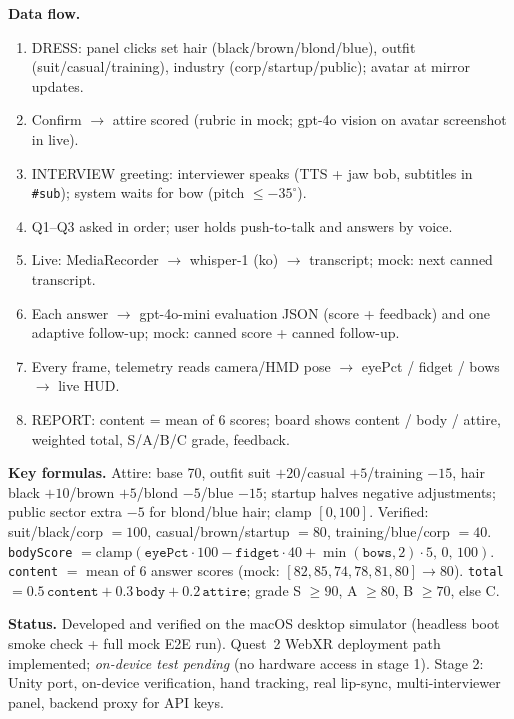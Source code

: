 \documentclass[10pt,a4paper]{article}
\begin{document}
\textbf{Data flow.}
{\footnotesize
\begin{enumerate}\setlength{\itemsep}{0pt}
  \item DRESS: panel clicks set hair (black/brown/blond/blue), outfit (suit/casual/training), industry (corp/startup/public); avatar at mirror updates.
  \item Confirm $\to$ attire scored (rubric in mock; gpt-4o vision on avatar screenshot in live).
  \item INTERVIEW greeting: interviewer speaks (TTS + jaw bob, subtitles in \texttt{\#sub}); system waits for bow (pitch $\le -35^\circ$).
  \item Q1--Q3 asked in order; user holds push-to-talk and answers by voice.
  \item Live: MediaRecorder $\to$ whisper-1 (ko) $\to$ transcript; mock: next canned transcript.
  \item Each answer $\to$ gpt-4o-mini evaluation JSON (score + feedback) and one adaptive follow-up; mock: canned score + canned follow-up.
  \item Every frame, telemetry reads camera/HMD pose $\to$ eyePct / fidget / bows $\to$ live HUD.
  \item REPORT: content = mean of 6 scores; board shows content / body / attire, weighted total, S/A/B/C grade, feedback.
\end{enumerate}}
\vspace{-4pt}

\textbf{Key formulas.} Attire: base 70, outfit suit $+20$/casual $+5$/training $-15$, hair black $+10$/brown $+5$/blond $-5$/blue $-15$; startup halves negative adjustments; public sector extra $-5$ for blond/blue hair; clamp $[0,100]$. Verified: suit/black/corp $=100$, casual/brown/startup $=80$, training/blue/corp $=40$. \;
\texttt{bodyScore} $=\mathrm{clamp}(\texttt{eyePct}\cdot100-\texttt{fidget}\cdot40+\min(\texttt{bows},2)\cdot5,\,0,\,100)$. \;
\texttt{content} $=$ mean of 6 answer scores (mock: $[82,85,74,78,81,80]\to80$). \;
\texttt{total} $=0.5\,\texttt{content}+0.3\,\texttt{body}+0.2\,\texttt{attire}$; grade S $\ge90$, A $\ge80$, B $\ge70$, else C.

\textbf{Status.} Developed and verified on the macOS desktop simulator (headless boot smoke check + full mock E2E run). Quest~2 WebXR deployment path implemented; \emph{on-device test pending} (no hardware access in stage 1). Stage 2: Unity port, on-device verification, hand tracking, real lip-sync, multi-interviewer panel, backend proxy for API keys.
\end{document}
